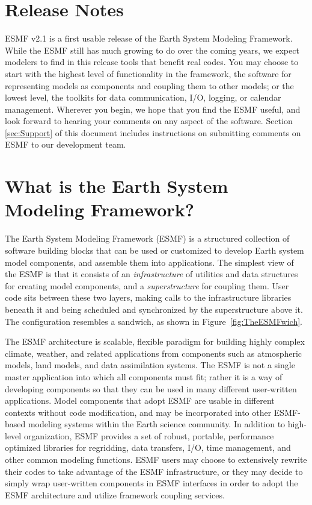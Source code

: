 
\section{Release Notes}

ESMF v2.1 is a first usable release of the Earth System 
Modeling Framework.  While the ESMF still has much growing to do
over the coming years, we expect modelers to find in this release 
tools that benefit real codes.  You may choose to start with the
highest level of functionality in the framework, the software
for representing models as components and coupling them to other
models; or the lowest level, the toolkits for data communication,
I/O, logging, or calendar management.  Wherever you begin, we hope
that you find the ESMF useful, and look forward to hearing your
comments on any aspect of the software.  
Section \ref{sec:Support} 
of this document includes instructions on submitting comments on 
ESMF to our development team.

\section{What is the Earth System Modeling Framework?}

The Earth System Modeling Framework (ESMF) is a structured collection of 
software building blocks that can be used or customized to develop 
Earth system model components, and assemble them into applications.  
The simplest view of the ESMF is that it consists of an {\it infrastructure} 
of utilities and data structures for creating 
model components, and a {\it superstructure} for coupling them.  
User code sits between these two layers, making calls to the infrastructure
libraries beneath it and being scheduled and synchronized by the 
superstructure above it.  The configuration resembles a sandwich, as
shown in Figure~\ref{fig:TheESMFwich}.

The ESMF architecture is scalable, flexible paradigm for building highly 
complex climate, weather, and related applications from components such
as atmospheric models, land models, and data assimilation systems.  The 
ESMF is not a single master application into which all components must fit; 
rather it is a way of developing components so that they can be used 
in many different user-written applications.  Model components that adopt 
ESMF are usable in different contexts without code modification, and may be
incorporated into other ESMF-based modeling systems within the Earth 
science community.  In addition to high-level organization, ESMF provides 
a set of robust, portable, performance optimized libraries for regridding, 
data transfers, I/O, time management, and other common modeling functions.  
ESMF users may choose to extensively rewrite their codes to take advantage 
of the ESMF infrastructure, or they may decide to simply wrap user-written 
components in ESMF interfaces in order to adopt the ESMF architecture and 
utilize framework coupling services.

